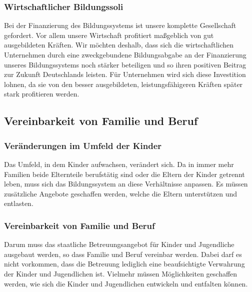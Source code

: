 
\subsubsection{Wirtschaftlicher Bildungssoli}
\abstimmung
Bei der Finanzierung des Bildungssystems ist unsere komplette Gesellschaft gefordert. Vor allem unsere Wirtschaft profitiert maßgeblich von gut ausgebildeten Kräften. Wir möchten deshalb, dass sich die wirtschaftlichen Unternehmen durch eine zweckgebundene Bildungsabgabe an der Finanzierung unseres Bildungssystems noch stärker beteiligen und so ihren positiven Beitrag zur Zukunft Deutschlands leisten. Für Unternehmen wird sich diese Investition lohnen, da sie von den besser ausgebildeten, leistungsfähigeren Kräften später stark profitieren werden.
 
\newpage
\subsection*{Vereinbarkeit von Familie und Beruf}

\subsubsection{Veränderungen im Umfeld der Kinder}
\abstimmung
Das Umfeld, in dem Kinder aufwachsen, verändert sich. Da in immer mehr Familien beide Elternteile berufstätig sind oder die Eltern der Kinder getrennt leben, muss sich das Bildungssystem an diese Verhältnisse anpassen. Es müssen zusätzliche Angebote geschaffen werden, welche die Eltern unterstützen und entlasten.

\subsubsection{Vereinbarkeit von Familie und Beruf}
\abstimmung
Darum muss das staatliche Betreuungsangebot für Kinder und Jugendliche ausgebaut werden, so dass Familie und Beruf vereinbar werden. Dabei darf es nicht vorkommen, dass die Betreuung lediglich eine beaufsichtigte Verwahrung der Kinder und Jugendlichen ist. Vielmehr müssen Möglichkeiten geschaffen werden, wie sich die Kinder und Jugendlichen entwickeln und entfalten können.
 

